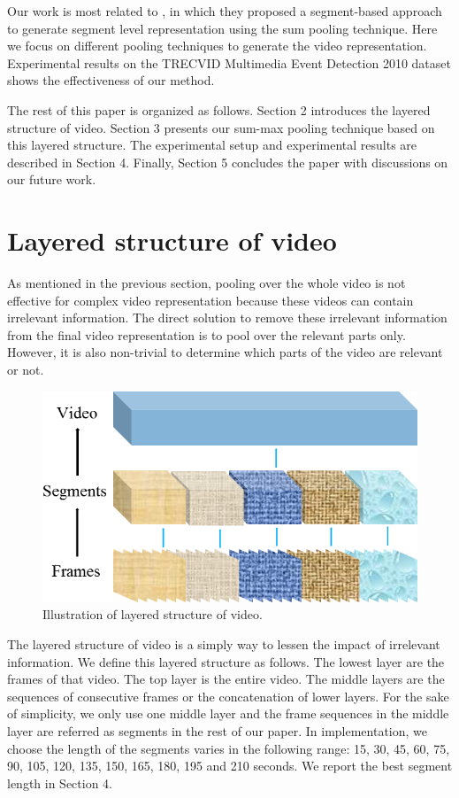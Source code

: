 Our work is most related to \cite{DBLP:journals/vlsisp/PhanNLTLDS14}, in which they proposed a segment-based approach to generate segment level representation using the sum pooling technique. Here we focus on different pooling techniques to generate the video representation. Experimental results on the TRECVID Multimedia Event Detection 2010 dataset shows the effectiveness of our method.

The rest of this paper is organized as follows. Section 2 introduces the layered structure of video. Section 3 presents our sum-max pooling technique based on this layered structure. The experimental setup and experimental results are described in Section 4. Finally, Section 5 concludes the paper with discussions on our future work.

\section{Layered structure of video}
\label{sec:format}
As mentioned in the previous section, pooling over the whole video is not effective for complex video representation because these videos can contain irrelevant information. The direct solution to remove these irrelevant information from the final video representation is to pool over the relevant parts only. However, it is also non-trivial to determine which parts of the video are relevant or not. 
\begin{figure}[!htb]
	\centering
	\includegraphics[width=1\textwidth]{layered.png}
	\caption{Illustration of layered structure of video.}
	\label{f_sum_max}
\end{figure}

The layered structure of video is a simply way to lessen the impact of irrelevant information. We define this layered structure as follows. The lowest layer are the frames of that video. The top layer is the entire video. The middle layers are the sequences of consecutive frames or the concatenation of lower layers. For the sake of simplicity, we only use one middle layer and the frame sequences in the middle layer are referred as segments in the rest of our paper. In implementation, we choose the length of the segments varies in the following range: 15, 30, 45, 60, 75, 90, 105, 120, 135, 150, 165, 180, 195 and 210 seconds. We report the best segment length in Section 4.

